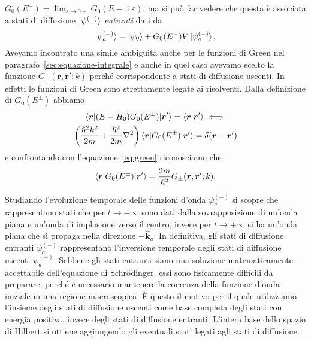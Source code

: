 \documentclass[a4paper,fleqn,twoside,12pt]{article}
\renewcommand{\epsilon}{\varepsilon}
\DeclareMathOperator{\uimm}{\mathrm{i}} %
\newcommand*{\versor}[1]{\hat{\bm{#1}}}
\begin{document}
$G_{0}(E^{-}) = \lim_{\epsilon \to 0+} G_{0}(E - \uimm \epsilon)$, ma si può far
vedere che questa è associata a stati di diffusione $\ket{\psi^{(-)}}$
\emph{entranti} dati da
\begin{equation}
  \ket{\psi_{a}^{(-)}} = \ket{\psi_{0}} + G_{0}(E^{-})V\ket{\psi_{a}^{(-)}}.
\end{equation}
Avevamo incontrato una simile ambiguità anche per le funzioni di Green nel
paragrafo~\ref{sec:equazione-integrale} e anche in quel caso avevamo scelto la
funzione $G_{+}(\bm{r},\bm{r}';k)$ perché corrispondente a stati di diffusione
uscenti.  In effetti le funzioni di Green sono strettamente legate ai
risolventi.  Dalla definizione di $G_{0}(E^{\pm})$ abbiamo
\begin{equation}
  \begin{gathered}
    \braket{\bm{r} | (E - H_{0})G_{0}(E^{\pm}) | \bm{r}'} = \braket{\bm{r} |
      \bm{r}'} \iff \\
    \bigg(\frac{\hslash^{2}k^{2}}{2m} + \frac{\hslash^{2}}{2m}\nabla^{2}\bigg)
    \braket{\bm{r} | G_{0}(E^{\pm}) | \bm{r}'} = \delta(\bm{r} - \bm{r}')
  \end{gathered}
\end{equation}
e confrontando con l'equazione~\eqref{eq:green} riconosciamo che
\begin{equation}
  \braket{\bm{r} | G_{0}(E^{\pm}) | \bm{r}'} =
  \frac{2m}{\hslash^{2}}G_{\pm}(\bm{r},\bm{r}';k).
\end{equation}

Studiando l'evoluzione temporale delle funzioni d'onda $\psi_{a}^{(-)}$ si
scopre che rappresentano stati che per $t \to -\infty$ sono dati dalla
sovrapposizione di un'onda piana e un'onda di implosione verso il centro, invece
per $t \to +\infty$ si ha un'onda piana che si propaga nella direzione
$-\versor{k}_{a}$.  In definitiva, gli stati di diffusione entranti
$\psi_{a}^{(-)}$ rappresentano l'inversione temporale degli stati di diffusione
uscenti $\psi_{a}^{(+)}$.  Sebbene gli stati entranti siano una soluzione
matematicamente accettabile dell'equazione di Schrödinger, essi sono fisicamente
difficili da preparare, perché è necessario mantenere la coerenza della funzione
d'onda iniziale in una regione macroscopica.  È questo il motivo per il quale
utilizziamo l'insieme degli stati di diffusione uscenti come base completa degli
stati con energia positiva, invece degli stati di diffusione entranti.  L'intera
base dello spazio di Hilbert si ottiene aggiungendo gli eventuali stati legati
agli stati di diffusione.
\end{document}
